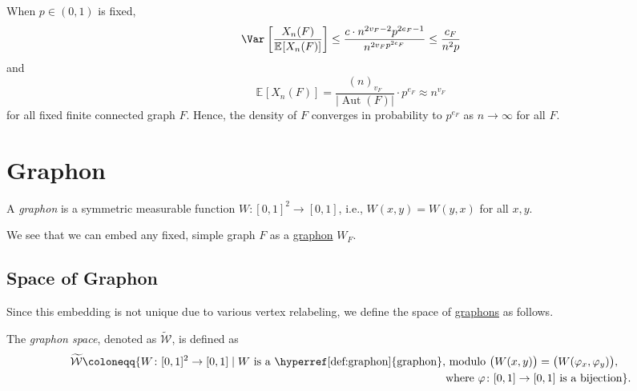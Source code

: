 When \(p \in (0, 1)\) is fixed,
\[
	\Var_{}\left[\frac{X_n(F)}{\mathbb{E}_{}[X_n(F)] }\right]
	\leq \frac{c \cdot n^{2v_F - 2} p^{2e_F - 1}}{n^{2v_F p^{2e_F}}}
	\leq \frac{c_F}{n^{2} p}
\]
and
\[
	\mathbb{E}_{}[X_n(F)]
	= \frac{(n)_{v_F}}{\lvert \operatorname{Aut}(F)  \rvert } \cdot p^{e_F}
	\approx n^{v_F}
\]
for all fixed finite connected graph \(F\). Hence, the density of \(F\) converges in probability to \(p^{e_F}\) as \(n \to \infty \) for all \(F\).

\section{Graphon}
\begin{definition}[Graphon]\label{def:graphon}
	A \emph{graphon} is a symmetric measurable function \(W \colon [0, 1]^2 \to [0, 1]\), i.e., \(W(x, y) = W(y, x)\) for all \(x, y\).
\end{definition}

\begin{eg}[Triangle]

\end{eg}

\begin{eg}[Crossing]

\end{eg}

We see that we can embed any fixed, simple graph \(F\) as a \hyperref[def:graphon]{graphon} \(W_F\).

\subsection{Space of Graphon}
Since this embedding is not unique due to various vertex relabeling, we define the space of \hyperref[def:graphon]{graphons} as follows.

\begin{definition}\label{def:graphon-space}
	The \emph{graphon space}, denoted as \(\widetilde{\mathcal{W} } \), is defined as
	\[
		\begin{split}
			\widetilde{\mathcal{W} }
			\coloneqq \{ W\colon [0, 1]^2 \to [0, 1] \mid W \text{ is a \hyperref[def:graphon]{graphon}}, & \text{ modulo \( \big( W(x, y) \big) = \big( W(\varphi _x, \varphi _y) \big) \)}, \\
			                                                                                              & \text{where \(\varphi \colon [0, 1] \to [0, 1] \) is a bijection} \}.
		\end{split}
	\]
\end{definition}

